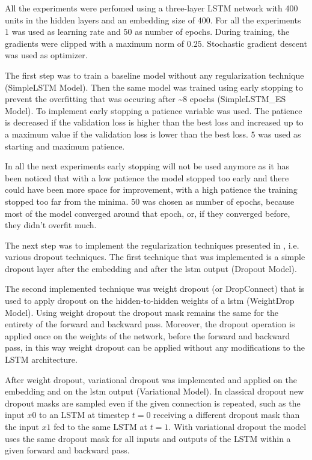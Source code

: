 \documentclass[a4paper]{article}
\begin{document}
All the experiments were perfomed using a three-layer LSTM network with 400 units in the hidden layers and an embedding size of
400.
For all the experiments $1$ was used as learning rate and $50$ as number of epochs. During training, the gradients were clipped
with a maximum norm of $0.25$. Stochastic gradient descent was used as optimizer.

The first step was to train a baseline model without any regularization technique (SimpleLSTM Model). Then the same model was trained
using early stopping to prevent the overfitting that was occuring after \textasciitilde{}$8$ epochs (SimpleLSTM\_ES Model). 
To implement early stopping a patience variable was used. The patience is decreased if the validation loss is higher than the best loss 
and increased up to a maximum value if the validation loss is lower than the best loss. $5$ was used as starting and maximum patience.

In all the next experiments early stopping will not be used anymore as it has been noticed that with a low patience the model 
stopped too early and there could have been more space for improvement, with a high patience the training stopped too far from 
the minima. $50$ was chosen as number of epochs, because most of the model converged around that epoch, or, if they converged 
before, they didn't overfit much.

The next step was to implement the regularization techniques presented in \cite{Merity}, i.e. various dropout techniques. The first 
technique that was implemented is a simple dropout layer after the embedding and after the lstm output (Dropout Model). 

The second implemented technique was weight dropout (or DropConnect)\cite{DropConnect} that is used to apply dropout on the hidden-to-hidden 
weights of a lstm (WeightDrop Model). Using weight dropout the dropout mask remains the same for the entirety of the forward and backward pass.
Moreover, the dropout operation is applied once on the weights of the network, before the forward and backward pass, 
in this way weight dropout can be applied without any modifications to the LSTM architecture. 

After weight dropout, variational dropout \cite{Variational} was implemented and applied on the embedding and on the lstm output (Variational Model).
In classical dropout new dropout masks are sampled even if the given connection
is repeated, such as the input $x0$ to an LSTM at timestep $t = 0$ receiving a different dropout mask than the input
$x1$ fed to the same LSTM at $t = 1$. With variational dropout the model uses the same dropout mask for all inputs and outputs of 
the LSTM within a given forward and backward pass. 
\end{document}
